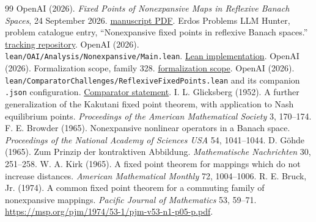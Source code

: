 \documentclass[11pt]{article}
\theoremstyle{definition}\newtheorem{definition}[theorem]{Definition}
\begin{document}
\begingroup\sloppy
\begin{thebibliography}{99}
 OpenAI (2026). \emph{Fixed Points of Nonexpansive Maps in Reflexive Banach Spaces}, 24 September 2026. \href{https://github.com/openai/math/blob/adc7f1241b42e322a6451854ab7e4b4c146bf78a/preprints/Fixed-Points-of-Nonexpansive-Maps-in-Reflexive-Banach-Spaces-September-24-2026/paper.pdf}{manuscript PDF}.
 Erdos Problems LLM Hunter, problem catalogue entry, ``Nonexpansive fixed points in reflexive Banach spaces.'' \href{https://github.com/mehmetmars7/Erdosproblems-llm-hunter}{tracking repository}.
 OpenAI (2026). \texttt{lean/OAI/Analysis/Nonexpansive/Main.lean}. \href{https://github.com/openai/math/blob/adc7f1241b42e322a6451854ab7e4b4c146bf78a/lean/OAI/Analysis/Nonexpansive/Main.lean}{Lean implementation}.
 OpenAI (2026). Formalization scope, family 328. \href{https://github.com/openai/math/blob/adc7f1241b42e322a6451854ab7e4b4c146bf78a/lean/docs/328.md}{formalization scope}.
 OpenAI (2026). \texttt{lean/ComparatorChallenges/ReflexiveFixedPoints.lean} and its companion \texttt{.json} configuration. \href{https://github.com/openai/math/blob/adc7f1241b42e322a6451854ab7e4b4c146bf78a/lean/ComparatorChallenges/ReflexiveFixedPoints.lean}{Comparator statement}.
 I. L. Glicksberg (1952). A further generalization of the Kakutani fixed point theorem, with application to Nash equilibrium points. \emph{Proceedings of the American Mathematical Society} 3, 170--174.
 F. E. Browder (1965). Nonexpansive nonlinear operators in a Banach space. \emph{Proceedings of the National Academy of Sciences USA} 54, 1041--1044.
 D. G\"ohde (1965). Zum Prinzip der kontraktiven Abbildung. \emph{Mathematische Nachrichten} 30, 251--258.
 W. A. Kirk (1965). A fixed point theorem for mappings which do not increase distances. \emph{American Mathematical Monthly} 72, 1004--1006.
 R. E. Bruck, Jr. (1974). A common fixed point theorem for a commuting family of nonexpansive mappings. \emph{Pacific Journal of Mathematics} 53, 59--71. \url{https://msp.org/pjm/1974/53-1/pjm-v53-n1-p05-p.pdf}.
\end{thebibliography}
\endgroup
\end{document}
